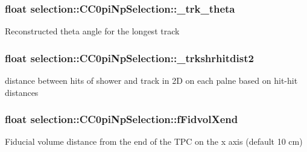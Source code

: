\subsubsection[{\texorpdfstring{\+\_\+trk\+\_\+theta}{_trk_theta}}]{\setlength{\rightskip}{0pt plus 5cm}float selection\+::\+C\+C0pi\+Np\+Selection\+::\+\_\+trk\+\_\+theta\hspace{0.3cm}{\ttfamily [private]}}\hypertarget{classselection_1_1CC0piNpSelection_a08cd38de74e9611829a3580a310c19f2}{}\label{classselection_1_1CC0piNpSelection_a08cd38de74e9611829a3580a310c19f2}
Reconstructed theta angle for the longest track 
\subsubsection[{\texorpdfstring{\+\_\+trkshrhitdist2}{_trkshrhitdist2}}]{\setlength{\rightskip}{0pt plus 5cm}float selection\+::\+C\+C0pi\+Np\+Selection\+::\+\_\+trkshrhitdist2\hspace{0.3cm}{\ttfamily [private]}}\hypertarget{classselection_1_1CC0piNpSelection_a75ceddff5c910a6da69588a04d931931}{}\label{classselection_1_1CC0piNpSelection_a75ceddff5c910a6da69588a04d931931}
distance between hits of shower and track in 2D on each palne based on hit-\/hit distances 
\subsubsection[{\texorpdfstring{f\+Fidvol\+Xend}{fFidvolXend}}]{\setlength{\rightskip}{0pt plus 5cm}float selection\+::\+C\+C0pi\+Np\+Selection\+::f\+Fidvol\+Xend\hspace{0.3cm}{\ttfamily [private]}}\hypertarget{classselection_1_1CC0piNpSelection_a754589459e1f2d90a8ad853c68f864db}{}\label{classselection_1_1CC0piNpSelection_a754589459e1f2d90a8ad853c68f864db}
Fiducial volume distance from the end of the T\+PC on the x axis (default 10 cm) 
